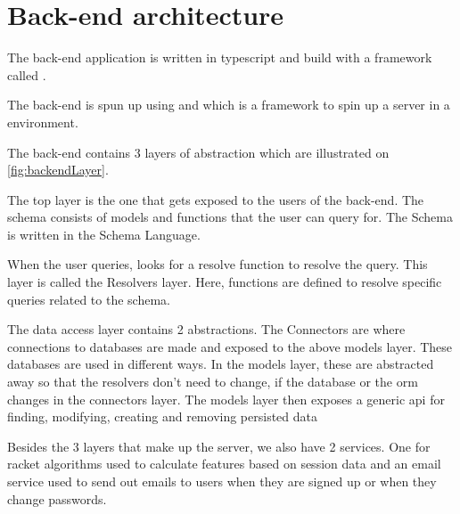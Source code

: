 \section{Back-end architecture}

The back-end application is written in \gls{typescript} and build with a framework called .

The back-end is spun up using  and  which is a framework to spin up a server in a  environment.

The back-end contains 3 layers of abstraction which are illustrated on \ref{fig:backendLayer}.


The top layer is the one that gets exposed to the users of the back-end. The schema consists of models and functions that the user can query for. The Schema is written in the  Schema Language.

When the user queries,  looks for a resolve function to resolve the query. This layer is called the Resolvers layer. Here, functions are defined to resolve specific queries related to the schema.

The data access layer contains 2 abstractions. The Connectors are where connections to databases are made and exposed to the above models layer. These databases are used in different ways. In the models layer, these are abstracted away so that the resolvers don't need to change, if the database or the \gls{orm} changes in the connectors layer. The models layer then exposes a generic \gls{api} for finding, modifying, creating and removing persisted data

Besides the 3 layers that make up the  server, we also have 2 services. One for racket algorithms used to calculate features based on session data and an email service used to send out emails to users when they are signed up or when they change passwords.